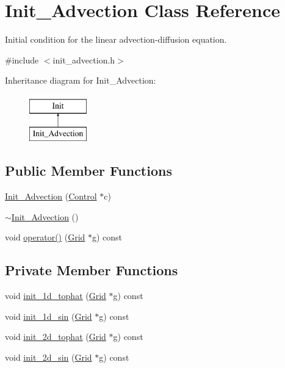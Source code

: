 \hypertarget{class_init___advection}{}\section{Init\+\_\+\+Advection Class Reference}
\label{class_init___advection}


Initial condition for the linear advection-\/diffusion equation.  




{\ttfamily \#include $<$init\+\_\+advection.\+h$>$}

Inheritance diagram for Init\+\_\+\+Advection\+:\begin{figure}[H]
\begin{center}
\leavevmode
\includegraphics[height=2.000000cm]{class_init___advection}
\end{center}
\end{figure}
\subsection*{Public Member Functions}
\begin{DoxyCompactItemize}
\item 
\hyperlink{class_init___advection_a7d15ce87d291abaddcd0dad556cb9469}{Init\+\_\+\+Advection} (\hyperlink{class_control}{Control} $\ast$c)
\item 
\hyperlink{class_init___advection_a4defc25e1485a0f8f8172ba2c45e8950}{$\sim$\+Init\+\_\+\+Advection} ()
\item 
void \hyperlink{class_init___advection_a336eaeee433ab0ec8a17eb61b9a17c41}{operator()} (\hyperlink{class_grid}{Grid} $\ast$g) const 
\end{DoxyCompactItemize}
\subsection*{Private Member Functions}
\begin{DoxyCompactItemize}
\item 
void \hyperlink{class_init___advection_a713f4d7ad7652070e41d995521d1b5ff}{init\+\_\+1d\+\_\+tophat} (\hyperlink{class_grid}{Grid} $\ast$g) const 
\item 
void \hyperlink{class_init___advection_a40cb7002a9a849adb5d9d7c9bca3e07e}{init\+\_\+1d\+\_\+sin} (\hyperlink{class_grid}{Grid} $\ast$g) const 
\item 
void \hyperlink{class_init___advection_a8100aa1f38bb3a9684e410b2ea167b8e}{init\+\_\+2d\+\_\+tophat} (\hyperlink{class_grid}{Grid} $\ast$g) const 
\item 
void \hyperlink{class_init___advection_a9dbd1a325e26cf02eac47fb45b980dbb}{init\+\_\+2d\+\_\+sin} (\hyperlink{class_grid}{Grid} $\ast$g) const 
\end{DoxyCompactItemize}
